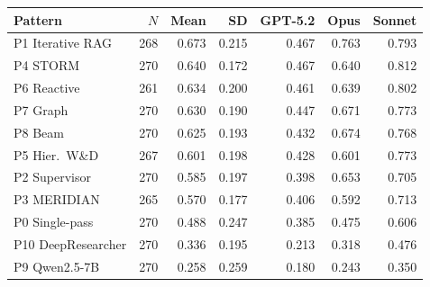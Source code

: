 \begin{tabular}{lrrrrrr}
\toprule
Pattern & $N$ & Mean & SD & GPT-5.2 & Opus & Sonnet\\
\midrule
P1 Iterative RAG & 268 & 0.673 & 0.215 & 0.467 & 0.763 & 0.793 \\
P4 STORM & 270 & 0.640 & 0.172 & 0.467 & 0.640 & 0.812 \\
P6 Reactive & 261 & 0.634 & 0.200 & 0.461 & 0.639 & 0.802 \\
P7 Graph & 270 & 0.630 & 0.190 & 0.447 & 0.671 & 0.773 \\
P8 Beam & 270 & 0.625 & 0.193 & 0.432 & 0.674 & 0.768 \\
P5 Hier.\ W\&D & 267 & 0.601 & 0.198 & 0.428 & 0.601 & 0.773 \\
P2 Supervisor & 270 & 0.585 & 0.197 & 0.398 & 0.653 & 0.705 \\
P3 MERIDIAN & 265 & 0.570 & 0.177 & 0.406 & 0.592 & 0.713 \\
P0 Single-pass & 270 & 0.488 & 0.247 & 0.385 & 0.475 & 0.606 \\
P10 DeepResearcher & 270 & 0.336 & 0.195 & 0.213 & 0.318 & 0.476 \\
P9 Qwen2.5-7B & 270 & 0.258 & 0.259 & 0.180 & 0.243 & 0.350 \\
\bottomrule
\end{tabular}